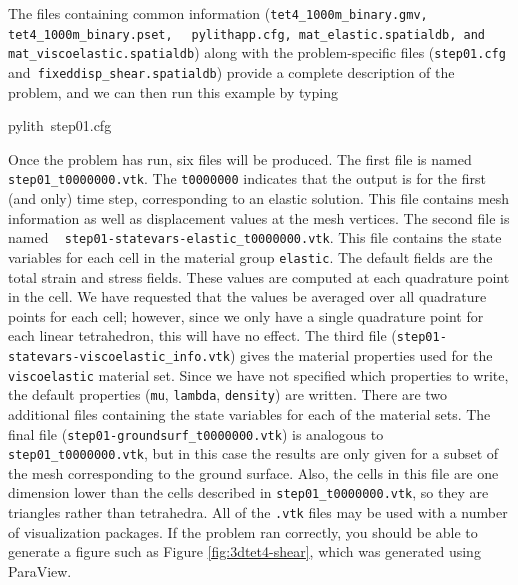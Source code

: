 The files containing common information (\texttt{tet4\_1000m\_binary.gmv,
tet4\_1000m\_binary.pset, }~\linebreak{}
\texttt{pylithapp.cfg, mat\_elastic.spatialdb, and mat\_viscoelastic.spatialdb})
along with the problem-specific files (\texttt{step01.cfg }and\texttt{
fixeddisp\_shear.spatialdb}) provide a complete description of the
problem, and we can then run this example by typing
\begin{lyxcode}
pylith~step01.cfg
\end{lyxcode}
Once the problem has run, six files will be produced. The first file
is named \texttt{step01\_t0000000.vtk}. The \texttt{t0000000} indicates
that the output is for the first (and only) time step, corresponding
to an elastic solution. This file contains mesh information as well
as displacement values at the mesh vertices. The second file is named
\texttt{}~\linebreak{}
\texttt{step01-statevars-elastic\_t0000000.vtk}. This file contains
the state variables for each cell in the material group \texttt{elastic}.
The default fields are the total strain and stress fields. These values
are computed at each quadrature point in the cell. We have requested
that the values be averaged over all quadrature points for each cell;
however, since we only have a single quadrature point for each linear
tetrahedron, this will have no effect. The third file (\texttt{step01-statevars-viscoelastic\_info.vtk})
gives the material properties used for the \texttt{viscoelastic} material
set. Since we have not specified which properties to write, the default
properties (\texttt{mu}, \texttt{lambda}, \texttt{density}) are written.
There are two additional files containing the state variables for
each of the material sets. The final file (\texttt{step01-groundsurf\_t0000000.vtk})
is analogous to \texttt{step01\_t0000000.vtk}, but in this case the
results are only given for a subset of the mesh corresponding to the
ground surface. Also, the cells in this file are one dimension lower
than the cells described in \texttt{step01\_t0000000.vtk}, so they
are triangles rather than tetrahedra. All of the \texttt{.vtk} files
may be used with a number of visualization packages. If the problem
ran correctly, you should be able to generate a figure such as Figure
\ref{fig:3dtet4-shear}, which was generated using ParaView.

